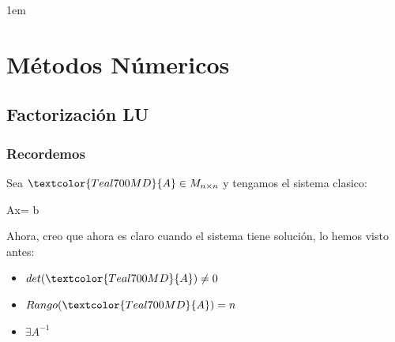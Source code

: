 \documentclass[12pt, fleqn]{report}                             %
\newenvironment{SmallIndentation}[1][0.75em]                    %
        {\begin{adjustwidth}{#1}{}\begin{footnotesize}}             %
        {\end{footnotesize}\end{adjustwidth}}                       %
\def \Eq {equation}                                             %
\newenvironment{MultiLineEquation*}[1]                          %
        {\begin{\Eq*}\begin{alignedat}{#1}}                         %
        {\end{alignedat}\end{\Eq*}}                                 %
\newenvironment{largeEq} {\begingroup \large}{\endgroup}        %
\theoremstyle{break}                                            %
\newcommand{\Color}[2]{\textcolor{#1}{#2}}                      %
\newcommand \ColorMatrixA       {Teal700MD}                     %
\newcommand \ColorVecX          {Green700MD}                    %
\newcommand \ColorVecB          {Red700MD}                      %
\newcommand \MatrixA      {\Color{\ColorMatrixA}{A}}            %
\newcommand \VecX         {\Color{\ColorVecX}{\vec x}}          %
\newcommand \VecB         {\Color{\ColorVecB}{\vec b}}          %
\begin{document}
\begin{itemize}
\begin{SmallIndentation}[1em]
\begin{itemize}
                            \end{itemize}
                        
                        \end{SmallIndentation}

                \end{itemize}

                       
                    

                    

\part{Métodos Númericos}


    \chapter{Factorización LU}

        \clearpage
        \section{Recordemos}

            Sea $\MatrixA \in M_{n \times n}$ y tengamos el sistema
            clasico:
            \begin{largeEq}
                \begin{MultiLineEquation*}{3}
                    \MatrixA \VecX = \VecB
                \end{MultiLineEquation*}
            \end{largeEq}

            Ahora, creo que ahora es claro cuando el sistema tiene solución, lo hemos
            visto antes:
            \begin{itemize}
                \item $det(\MatrixA) \neq 0$
                \item $Rango(\MatrixA) = n$
                \item $\exists A^{-1}$
            \end{itemize}
\end{document}
